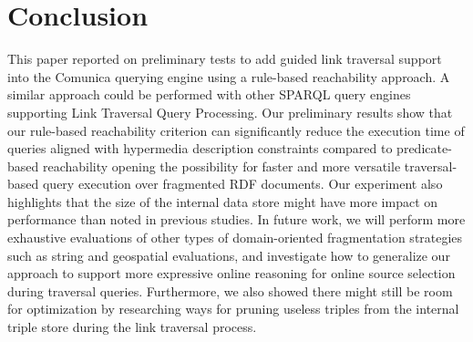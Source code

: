 \section{Conclusion}

This paper reported on preliminary tests to add guided link traversal support into the Comunica querying engine using a rule-based reachability approach.
A similar approach could be performed with other SPARQL query engines supporting Link Traversal Query Processing. 
Our preliminary results show that our rule-based reachability criterion can significantly reduce the execution time of queries aligned with hypermedia description constraints compared to predicate-based reachability
opening the possibility for faster and more versatile traversal-based query execution over fragmented RDF documents.
Our experiment also highlights that the size of the internal data store might have more impact on performance than noted in previous studies.
In future work, we will perform more exhaustive evaluations of other types of domain-oriented fragmentation strategies such as string and geospatial evaluations,
and investigate how to generalize our approach to support more expressive online reasoning for online source selection during traversal queries.
Furthermore, we also showed there might still be room for optimization by researching ways for pruning useless triples from the internal triple store during the link traversal process.

